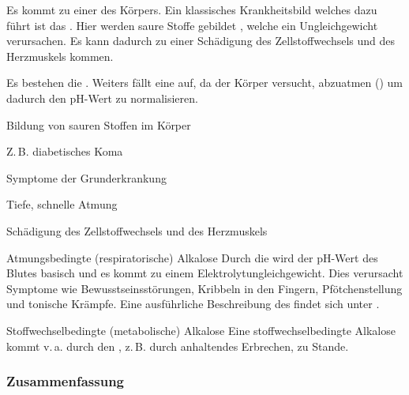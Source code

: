{%
\label{topic:azidose-metabolische}
Es kommt zu einer  des
Körpers.
Ein klassisches Krankheitsbild welches dazu führt  ist das
. Hier werden saure
Stoffe gebildet , welche ein
Ungleichgewicht verursachen. Es kann dadurch zu einer
Schädigung des Zellstoffwechsels und des Herzmuskels kommen.

Es bestehen die . Weiters
fällt eine  auf, da der Körper
versucht,  abzuatmen () um
dadurch den pH-Wert zu normalisieren.



\bigskip

\bigskip

}{%
\begin{compactitem}
  \item Bildung von sauren Stoffen im Körper
  
  Z.\,B. diabetisches Koma
  \item Symptome der Grunderkrankung
  \item Tiefe, schnelle Atmung
  \item Schädigung des Zellstoffwechsels und des
  Herzmuskels
\end{compactitem}
}{}{}{}


{Atmungsbedingte (respiratorische) Alkalose}
{\label{topic:alkalose-respiratorische}
Durch die  wird der
pH-Wert des Blutes basisch und es kommt zu einem
Elektrolytungleichgewicht. Dies verursacht Symptome wie
Bewusstseinsstörungen, Kribbeln in den Fingern,
Pfötchenstellung und tonische Krämpfe.
Eine ausführliche Beschreibung des
 findet sich unter
.}
{}
{}
{}
{}

{Stoffwechselbedingte (metabolische) Alkalose}
{\label{topic:alkalose-metabolische}
Eine stoffwechselbedingte Alkalose  kommt v.\,a. durch den
, z.\,B. durch anhaltendes Erbrechen,
zu Stande.}
{}
{}
{}
{}


\subsubsection*{Zusammenfassung}


